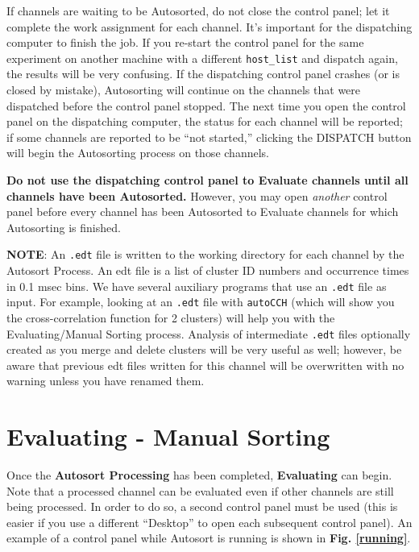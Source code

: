 \documentclass[12pt]{article}
\begin{document}
If channels are waiting to be Autosorted, do not close the control
panel; let it complete the work assignment for each channel. It's
important for the dispatching computer to finish the job. If you
re-start the control panel for the same experiment on another machine
with a different {\tt host\_list} and dispatch again, the results will
be very confusing.  If the dispatching control panel crashes (or is
closed by mistake), Autosorting will continue on the channels that
were dispatched before the control panel stopped. The next time you
open the control panel on the dispatching computer, the status for
each channel will be reported; if some channels are reported to be
``not started,'' clicking the {\sf DISPATCH} button will begin the
Autosorting process on those channels.

\textbf{Do not use the dispatching control panel to Evaluate channels
  until all channels have been Autosorted.} However, you may open
\textit{another} control panel before every channel has been
Autosorted to Evaluate channels for which Autosorting is finished.

\textbf{NOTE}: An {\tt .edt} file is written to the working directory
for each channel by the Autosort Process. An edt file is a list of
cluster ID numbers and occurrence times in 0.1 msec bins. We have
several auxiliary programs that use an {\tt .edt} file as input. For
example, looking at an {\tt .edt} file with {\tt autoCCH} (which will
show you the cross-correlation function for 2 clusters) will help you
with the Evaluating/Manual Sorting process. Analysis of intermediate
{\tt .edt} files optionally created as you merge and delete clusters
will be very useful as well; however, be aware that previous edt files
written for this channel will be overwritten with no warning unless
you have renamed them.

\clearpage
\section{Evaluating - Manual Sorting}

Once the \textbf{Autosort Processing} has been completed,
\textbf{Evaluating} can begin. Note that a processed channel can be
evaluated even if other channels are still being processed. In order
to do so, a second control panel must be used (this is easier if you
use a different ``Desktop'' to open each subsequent control panel).
An example of a control panel while Autosort is running is shown in
\textbf{Fig. \ref{running}}.
\end{document}
